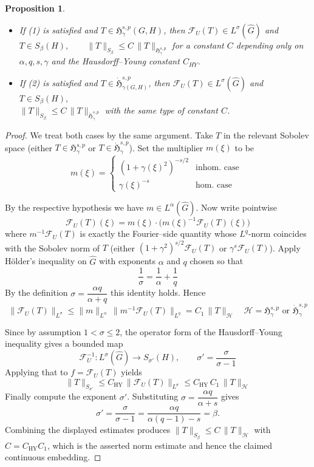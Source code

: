 \documentclass[11pt,a4paper]{article}
\newtheorem{proposition}[theorem]{Proposition}
\theoremstyle{definition}
\newcommand{\F}{\mathcal{F}}
\begin{document}
\begin{proposition}
\label{thm:main-embedding-corrected}
\begin{itemize}
\item[(i)] If (1) is satisfied and $T\in \mathfrak{H}^{s,p}_\gamma(G,H)$, then $\F_U(T)\in L^\sigma(\widehat G)$ and $T\in S_{\beta}(H), \qquad \|T\|_{S_\beta}\le C\,\|T\|_{\mathfrak{H}^{s,p}_\gamma}$ for a constant $C$ depending only on $\alpha,q,s,\gamma$ and the Hausdorff--Young constant $C_{HY}$.

\item[(ii)] If (2) is satisfied and $T\in\dot{\mathfrak{H}}^{s,p}_{\gamma(G,H)}$, then $\F_U(T)\in L^\sigma(\widehat G)$ and $T\in S_{\beta}(H),$ \\$  \|T\|_{S_\beta}\le C\,\|T\|_{\dot{\mathfrak{H}}^{s,p}_\gamma}$
with the same type of constant $C$.
\end{itemize}
\end{proposition}

\begin{proof}
We treat both cases by the same argument. Take $T$ in the relevant Sobolev space (either $T\in \mathfrak{H}^{s,p}_\gamma$ or
$T\in\dot{\mathfrak{H}}^{s,p}_\gamma$). Set the multiplier \(m(\xi)\) to be
\[
m(\xi)=
\begin{cases}
(1+\gamma(\xi)^2)^{-s/2} &\text{inhom. case }\\[4pt]
\gamma(\xi)^{-s} &\text{hom. case }
\end{cases}
\]

By the respective hypothesis we have \(m\in L^\alpha(\widehat G)\). Now write pointwise
\[
\F_U(T)(\xi)= m(\xi)\cdot \bigg( m(\xi)^{-1}\F_U(T)(\xi)\bigg)
\]
where \(m^{-1}\F_U(T)\) is exactly the Fourier–side quantity whose \(L^q\)-norm
coincides with the Sobolev norm of \(T\) (either \((1+\gamma^2)^{s/2}\F_U(T)\)
or \(\gamma^s \F_U(T)\)). Apply Hölder's inequality on \(\widehat G\) with
exponents \(\alpha\) and \(q\) chosen so that
\[
\frac{1}{\sigma}=\frac{1}{\alpha}+\frac{1}{q}
\]
By the definition \(\sigma=\dfrac{\alpha q}{\alpha+q}\) this identity holds.
Hence
\[
\|\F_U(T)\|_{L^\sigma}
\le \|m\|_{L^\alpha}\,\|m^{-1}\F_U(T)\|_{L^q}
= C_1\,\|T\|_{\mathcal H} \quad \mathcal{H} =  {\mathfrak{H}^{s,p}_\gamma} \text{ or } {\dot{\mathfrak{H}}^{s,p}_\gamma}
\]

Since by assumption \(1<\sigma\le2\), the operator form of the
Hausdorff--Young inequality gives a bounded map
\[
\mathcal{F}_U^{-1}:L^\sigma(\widehat G)\longrightarrow S_{\sigma'}(H),
\qquad \sigma'=\frac{\sigma}{\sigma-1}
\]
Applying that to \(f=\F_U(T)\) yields
\[
\|T\|_{S_{\sigma'}} \le C_{\mathrm{HY}}\,\|\F_U(T)\|_{L^\sigma}
\le C_{\mathrm{HY}}\,C_1\,\|T\|_{\mathcal H}
\]
Finally compute the exponent \(\sigma'\). Substituting
\(\sigma=\dfrac{\alpha q}{\alpha+s}\) gives
\[
\sigma'=\frac{\sigma}{\sigma-1}=\frac{\alpha q}{\alpha(q-1)-s}=\beta.
\]
Combining the displayed estimates produces $\|T\|_{S_\beta}\le C\,\|T\|_{\mathcal H}$ with \(C=C_{\mathrm{HY}}C_1\), which is the asserted norm estimate and hence the claimed continuous embedding.
\end{proof}
\end{document}
